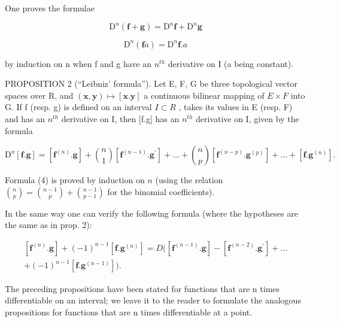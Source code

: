 One proves the formulae

\[
\mathrm{D} ^ {n} (\mathbf {f} + \mathbf {g}) = \mathrm{D} ^ {n} \mathbf {f} + \mathrm{D} ^ {n} \mathbf {g}\tag{2}
\]

\[
\mathrm{D} ^ {n} (\mathbf {f} a) = \mathrm{D} ^ {n} \mathbf {f}. a\tag{3}
\]

by induction on n when f and g have an \(n^{th}\) derivative on I (a being constant).

PROPOSITION 2 (``Leibniz' formula''). Let E, F, G be three topological vector spaces over R, and \((\mathbf{x}, \mathbf{y}) \mapsto [\mathbf{x}.\mathbf{y}]\) a continuous bilinear mapping of \(E \times F\) into G. If f (resp. g) is defined on an interval \(I \subset R\) , takes its values in E (resp. F) and has an \(n^{th}\) derivative on I, then {[}f.g{]} has an \(n^{th}\) derivative on I, given by the formula

\[
\mathrm{D} ^ {n} [ \mathbf {f}. \mathbf {g} ] = [ \mathbf {f} ^ {(n)}. \mathbf {g} ] + \binom {n} {1} [ \mathbf {f} ^ {(n - 1)}. \mathbf {g} ^ {\prime} ] + \dots + \binom {n} {p} [ \mathbf {f} ^ {(n - p)}. \mathbf {g} ^ {(p)} ] + \dots + [ \mathbf {f}. \mathbf {g} ^ {(n)} ].\tag{4}
\]

Formula (4) is proved by induction on \(n\) (using the relation \(\binom{n}{p} = \binom{n-1}{p} + \binom{n-1}{p-1}\) for the binomial coefficients).

In the same way one can verify the following formula (where the hypotheses are the same as in prop. 2):

\[
\begin{array}{c} [ \mathbf {f} ^ {(n)}. \mathbf {g} ] + (- 1) ^ {n - 1} [ \mathbf {f}. \mathbf {g} ^ {(n)} ] = D \big ([ \mathbf {f} ^ {(n - 1)}. \mathbf {g} ] - [ \mathbf {f} ^ {(n - 2)}. \mathbf {g} ^ {\prime} ] + \dots \\ + (- 1) ^ {n - 1} [ \mathbf {f}. \mathbf {g} ^ {(n - 1)} ] \big). \end{array}\tag{5}
\]

The preceding propositions have been stated for functions that are n times differentiable on an interval; we leave it to the reader to formulate the analogous propositions for functions that are n times differentiable at a point.


